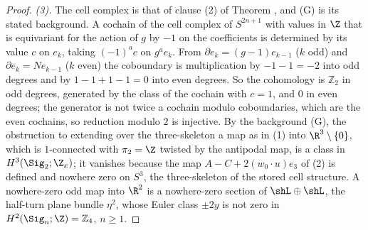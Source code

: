 \begin{proof}
\emph{(3).} The cell complex is that of clause (2) of Theorem , and (G) is its stated background. A cochain of the cell complex of $S^{2n+1}$ with values in $\Z$ that is equivariant for the action of $g$ by $-1$ on the coefficients is determined by its value $c$ on $e_{k}$, taking $(-1)^{a}c$ on $g^{a}e_{k}$. From $\partial e_{k} = (g - 1)e_{k-1}$ ($k$ odd) and $\partial e_{k} = Ne_{k-1}$ ($k$ even) the coboundary is multiplication by $-1 - 1 = -2$ into odd degrees and by $1 - 1 + 1 - 1 = 0$ into even degrees. So the cohomology is $\mathbb{Z}_{2}$ in odd degrees, generated by the class of the cochain with $c = 1$, and $0$ in even degrees; the generator is not twice a cochain modulo coboundaries, which are the even cochains, so reduction modulo $2$ is injective. By the background (G), the obstruction to extending over the three-skeleton a map as in (1) into $\R^{3} \setminus \{0\}$, which is $1$-connected with $\pi_{2} = \Z$ twisted by the antipodal map, is a class in $H^{3}(\Sig_{2}; \Z_{x})$; it vanishes because the map $A - C + 2(w_{0}\cdot u)e_{3}$ of (2) is defined and nowhere zero on $S^{3}$, the three-skeleton of the stored cell structure. A nowhere-zero odd map into $\R^{2}$ is a nowhere-zero section of $\shL \oplus \shL$, the half-turn plane bundle $\eta^{2}$, whose Euler class $\pm 2y$ is not zero in $H^{2}(\Sig_{n}; \Z) = \mathbb{Z}_{4}$, $n \geq 1$.


\end{proof}
